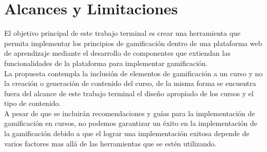 \section{Alcances y Limitaciones} \label{sec:alcancesLimitaciones}

 El objetivo principal de este trabajo terminal es crear una herramienta que permita
 implementar los principios de gamificación dentro de una plataforma web de aprendizaje
 mediante el desarrollo de componentes que extiendan las funcionalidades de la plataforma
 para implementar gamificación.\\

 \noindent La propuesta contempla la inclusión de elementos de gamificación
 a un curso y no la creación o generación de contenido del curso, de la misma forma
 se encuentra fuera del alcance de este trabajo terminal el diseño apropiado de los
 cursos y el tipo de contenido.\\

 \noindent A pesar de que se incluirán recomendaciones y guías para la implementación de gamificación
 en cursos, no podemos garantizar un éxito en la implementación de la gamificación debido a
 que el lograr una implementación exitosa depende de varios factores mas allá de las herramientas
 que se estén utilizando.

